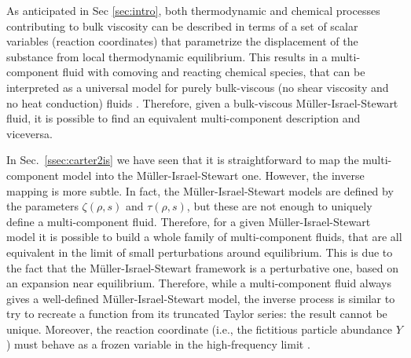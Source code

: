 \documentclass[aps,prd,twocolumn,a4paper,floatfix,nofootbib,superscriptaddress,nofootinbib]{revtex4}
\begin{document}
As anticipated in Sec \ref{sec:intro}, both thermodynamic and chemical
processes contributing to bulk viscosity can be described in terms of a set of
scalar variables (reaction coordinates) that parametrize the displacement of
the substance from local thermodynamic equilibrium.  This results in a
multi-component fluid with comoving and reacting chemical species, that can be
interpreted as a universal model for purely bulk-viscous (no shear viscosity
and no heat conduction) fluids \citep{Gavassino21bulk, Frontiers_2021}.
Therefore, given a bulk-viscous M\"uller-Israel-Stewart fluid, it is possible to find an
equivalent multi-component description and viceversa.

In Sec.~\ref{ssec:carter2is} we have seen that it is straightforward to map the
multi-component model into the M\"uller-Israel-Stewart one. However, the
inverse mapping is more subtle.  In fact, the M\"uller-Israel-Stewart
models are defined by the parameters $\zeta(\rho,s)$ and
$\tau(\rho,s)$, but these are not enough to uniquely define a multi-component
fluid. Therefore, for a  given M\"uller-Israel-Stewart model it is possible to build a
whole family of multi-component fluids, that are all equivalent in the limit of small perturbations around equilibrium.
This is due to the fact that the M\"uller-Israel-Stewart framework is a
perturbative one, based on an expansion near equilibrium. Therefore, while a
multi-component fluid always gives a well-defined
M\"uller-Israel-Stewart model, the inverse process is similar to try to recreate a
function from its truncated Taylor series: the result cannot be unique.
Moreover, the reaction coordinate (i.e., the fictitious particle abundance
$Y$) must behave as a frozen variable in the high-frequency limit
\cite{Gavassino21bulk}.
\end{document}
